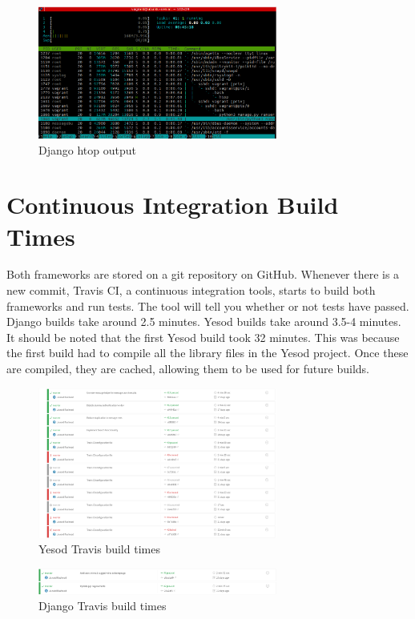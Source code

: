 \begin{figure}[H]
    \centering
    \includegraphics[width=0.7\textwidth]{final_report/pics/djangoIdle.png}
    \caption{Django htop output}
    \label{fig:djangoHtop}
\end{figure}

\section{Continuous Integration Build Times}

Both frameworks are stored on a git repository on GitHub. Whenever there is a
new commit, Travis CI, a continuous integration tools, starts to build
both frameworks and run tests. The tool will tell you whether or not tests
have passed. Django builds take around 2.5 minutes. Yesod builds take around
3.5-4 minutes. It should be noted that the first Yesod build took 32 minutes.
This was because the first build had to compile all the library files in the
Yesod project. Once these are compiled, they are cached, allowing them to
be used for future builds.

\begin{figure}[H]
    \centering
    \includegraphics[width=0.7\textwidth]{final_report/pics/yesodTravis.png}
    \caption{Yesod Travis build times}
    \label{fig:yesodTravis}
\end{figure}

\begin{figure}[H]
    \centering
    \includegraphics[width=0.7\textwidth]{final_report/pics/djangoTravis.png}
    \caption{Django Travis build times}
    \label{fig:djangoTravis}
\end{figure}

